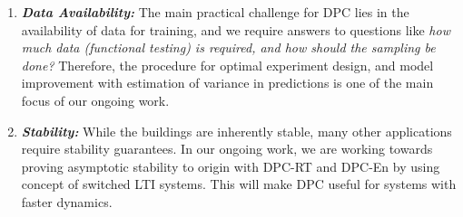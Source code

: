 \begin{enumerate}
\item \emph{\textbf{Data Availability:}} The main practical challenge for DPC lies in the availability of data for training, and we require answers to questions like \emph{how much data (functional testing) is required, and how should the sampling be done?} Therefore, the procedure for optimal experiment design, and model improvement with estimation of variance in predictions is one of the main focus of our ongoing work.
\item \emph{\textbf{Stability:}} While the buildings are inherently stable, many other applications require stability guarantees. In our ongoing work, we are working towards proving asymptotic stability to origin with DPC-RT and DPC-En by using concept of switched LTI systems. This will make DPC useful for systems with faster dynamics.
\end{enumerate}